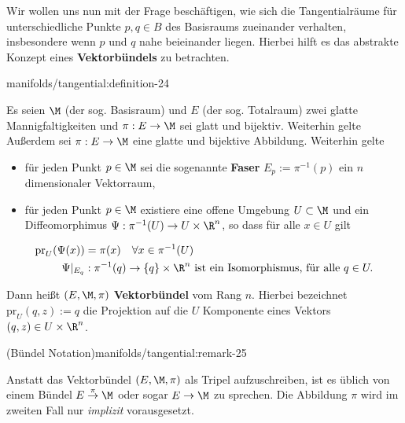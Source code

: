 \documentclass[letterpaper,10pt,german]{jupyterBook}
\begin{document}
\par
Wir wollen uns nun mit der Frage beschäftigen, wie sich die Tangentialräume für unterschiedliche Punkte \(p,q\in B\) des Basisraums zueinander verhalten, insbesondere wenn \(p\) und \(q\) nahe beieinander liegen.
Hierbei hilft es das abstrakte Konzept eines \textbf{Vektorbündels} zu betrachten.
\begin{definition}{}{manifolds/tangential:definition-24}



\par
Es seien \(\M\) (der sog. Basisraum) und \(E\) (der sog. Totalraum) zwei glatte Mannigfaltigkeiten und \(\pi:E\to \M\) sei glatt und bijektiv. Weiterhin gelte
Außerdem sei \(\pi:E\to \M\) eine glatte und bijektive Abbildung.
Weiterhin gelte
\begin{itemize}
\item {} 
\par
für jeden Punkt \(p\in \M\) sei die sogenannte \textbf{Faser} \(E_p:= \pi^{-1}(p)\) ein \(n\) dimensionaler Vektorraum,

\item {} 
\par
für jeden Punkt \(p\in \M\) existiere eine offene Umgebung \(U\subset \M\) und ein Diffeomorphimus \(\Psi: \pi^{-1}(U)\to U\times\R^n\), so dass für alle \(x\in U\) gilt

\end{itemize}
\begin{align*}
\text{pr}_U(\Psi(x)) &= \pi(x)\quad\forall x\in \pi^{-1}(U)\\
\Psi\rvert_{E_q}&: \pi^{-1}(q) \to \{q\}\times \R^n \text{ ist ein Isomorphismus, für alle }q\in U.
\end{align*}
\par
Dann heißt \((E,\M,\pi)\) \textbf{Vektorbündel} vom Rang \(n\).
Hierbei bezeichnet \(\text{pr}_U(q, z):= q\) die Projektion auf die \(U\) Komponente eines Vektors \((q,z)\in U\times\R^n\).
\end{definition}
\begin{remark}{(Bündel Notation)}{manifolds/tangential:remark-25}



\par
Anstatt das Vektorbündel \((E,\M,\pi)\) als Tripel aufzuschreiben, ist es üblich von einem Bündel \(E\overset{\pi}{\to}\M\) oder sogar \(E\to\M\) zu sprechen.
Die Abbildung \(\pi\) wird im zweiten Fall nur \emph{implizit} vorausgesetzt.
\end{remark}
\end{document}
